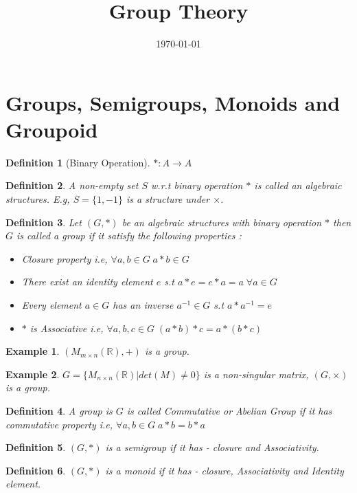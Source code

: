 \documentclass[12pt,a4paper]{article}
\title{Group Theory \vspace{-2em}}
\date{\today}
\newcommand{\R}{\mathbb{R}}
\newtheorem*{defn}{Definition}
\newtheorem{ex}{Example}
\begin{document}
  \maketitle
  
  \section{Groups, Semigroups, Monoids and Groupoid}
  
  \begin{defn}[Binary Operation]
  	$*: A \to A$
  \end{defn}
  
  \begin{defn}
   A non-empty set $S$ w.r.t binary operation $*$ is called an algebraic structures. E.g, $S=\{1,-1\}$ is a structure under $\times$.
  \end{defn}
  
 \begin{defn}
 	    Let $(G,*)$ be an algebraic structures with binary operation $*$ then $G$ is called a group if it satisfy the following properties :
 	\begin{itemize}
 		\item Closure property i.e, $\forall a,b \in G\; a*b\in G$
 		\item There exist an identity element $e$ s.t $a*e=e*a=a\; \forall a\in G$
 		\item Every element $a\in G$ has an inverse $a^{-1}\in G$ s.t $a*a^{-1}=e$
 		\item $*$ is Associative i.e, $\forall a,b,c \in G\; (a*b)*c=a*(b*c)$
 	\end{itemize}
 \end{defn}
\begin{ex}
	$(M_{m\times n}(\R), +)$ is a group.
\end{ex}
\begin{ex}
	$G=\{M_{n\times n}(\R) | det(M) \ne 0 \}$ is a non-singular matrix, $(G,\times)$ is a group.
\end{ex}
\begin{defn}
	A group is $G$ is called Commutative or Abelian Group if it has commutative property i.e, $\forall a,b\in G\; a*b=b*a$
\end{defn}
\begin{defn}
	$(G,*)$ is a semigroup if it has - closure and Associativity.
\end{defn}
\begin{defn}
	$(G,*)$ is a monoid if it has - closure, Associativity and Identity element.
\end{defn}
\end{document}

